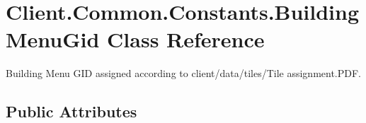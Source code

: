 \hypertarget{classClient_1_1Common_1_1Constants_1_1BuildingMenuGid}{}\section{Client.\+Common.\+Constants.\+Building\+Menu\+Gid Class Reference}
\label{classClient_1_1Common_1_1Constants_1_1BuildingMenuGid}


Building Menu G\+I\+D assigned according to \textquotesingle{}client/data/tiles/\+Tile assignment.\+P\+D\+F\textquotesingle{}.  


\subsection*{Public Attributes}
